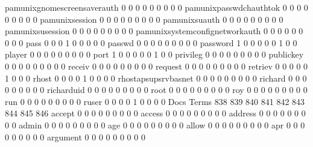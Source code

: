 \documentclass[compress,8pt]{beamer}
\begin{document}
\begin{frame}
\begin{Schunk}
  pamunixgnomescreensaverauth                0   0   0   0   0   0   0   0   0
  pamunixpasswdchauthtok                     0   0   0   0   0   0   0   0   0
  pamunixsession                             0   0   0   0   0   0   0   0   0
  pamunixsuauth                              0   0   0   0   0   0   0   0   0
  pamunixsusession                           0   0   0   0   0   0   0   0   0
  pamunixsystemconfignetworkauth             0   0   0   0   0   0   0   0   0
  pass                                       0   0   0   1   0   0   0   0   0
  passwd                                     0   0   0   0   0   0   0   0   0
  password                                   1   0   0   0   0   0   1   0   0
  player                                     0   0   0   0   0   0   0   0   0
  port                                       1   0   0   0   0   0   1   0   0
  privileg                                   0   0   0   0   0   0   0   0   0
  publickey                                  0   0   0   0   0   0   0   0   0
  receiv                                     0   0   0   0   0   0   0   0   0
  request                                    0   0   0   0   0   0   0   0   0
  retriev                                    0   0   0   0   0   1   0   0   0
  rhost                                      0   0   0   0   1   0   0   0   0
  rhostapsupsrvbasnet                        0   0   0   0   0   0   0   0   0
  richard                                    0   0   0   0   0   0   0   0   0
  richarduid                                 0   0   0   0   0   0   0   0   0
  root                                       0   0   0   0   0   0   0   0   0
  roy                                        0   0   0   0   0   0   0   0   0
  run                                        0   0   0   0   0   0   0   0   0
  ruser                                      0   0   0   0   1   0   0   0   0
                                          Docs
Terms                                      838 839 840 841 842 843 844 845 846
  accept                                     0   0   0   0   0   0   0   0   0
  access                                     0   0   0   0   0   0   0   0   0
  address                                    0   0   0   0   0   0   0   0   0
  admin                                      0   0   0   0   0   0   0   0   0
  age                                        0   0   0   0   0   0   0   0   0
  allow                                      0   0   0   0   0   0   0   0   0
  apr                                        0   0   0   0   0   0   0   0   0
  argument                                   0   0   0   0   0   0   0   0   0

\end{Schunk}
\end{frame}
\end{document}
